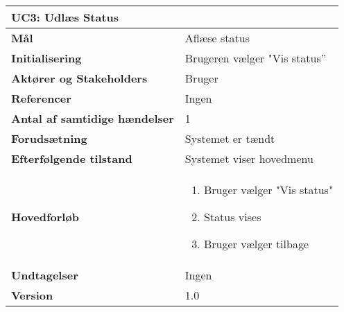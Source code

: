 \begin{table}[H] \centering
\begin{tabular}{|p{6cm}|p{8cm}|}
	\hline
\multicolumn{2}{|l|}{\textbf{UC3: Udlæs Status}} \\\hline
\textbf{Mål}	&
Aflæse status \\\hline
\textbf{Initialisering} &
Brugeren vælger "Vis status” \\\hline
\textbf{Aktører og Stakeholders} &
Bruger \\\hline
\textbf{Referencer} &
Ingen \\\hline
\textbf{Antal af samtidige hændelser} &
1 \\\hline
\textbf{Forudsætning} &
Systemet er tændt \\\hline
\textbf{Efterfølgende tilstand} &
Systemet viser hovedmenu \\\hline
\textbf{Hovedforløb} &
\begin{enumerate}
\item Bruger vælger "Vis status"
\item Status vises
\item Bruger vælger tilbage
\end{enumerate} \\\hline
\textbf{Undtagelser} &
Ingen \\\hline
		\textbf{Version}		&1.0 \\\hline
	\end{tabular}
	\label{UC3} 
\end{table}